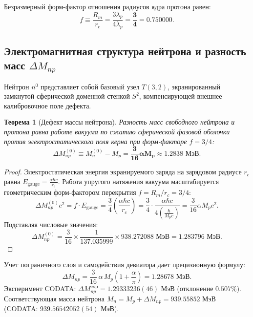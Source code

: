 \documentclass[11pt,a4paper]{article}
\newtheorem{theorem}{Теорема}[section]
\theoremstyle{definition}
\theoremstyle{remark}
\begin{document}
Безразмерный форм-фактор отношения радиусов ядра протона равен:
\begin{equation}
    f \equiv \frac{R_m}{r_c} = \frac{3\lambda_p}{4\lambda_p} = \boldsymbol{\frac{3}{4}} = 0.750000.
    \label{eq:radius_ratio}
\end{equation}

\subsection{Электромагнитная структура нейтрона и разность масс $\Delta M_{np}$}
Нейтрон $n^0$ представляет собой базовый узел $T(3,2)$, экранированный замкнутой сферической доменной стенкой $S^2$, компенсирующей внешнее калибровочное поле дефекта.

\begin{theorem}[Дефект массы нейтрона]
Разность масс свободного нейтрона и протона равна работе вакуума по сжатию сферической фазовой оболочки против электростатического поля керна при форм-факторе $f = 3/4$:
\begin{equation}
    \Delta M_{np}^{(0)} \equiv M_n^{(0)} - M_p = \boldsymbol{\frac{3}{16}\alpha M_p} \approx \mathbf{1.2838\text{ МэВ}}.
    \label{eq:delta_mnp_tree}
\end{equation}
\end{theorem}

\begin{proof}
Электростатическая энергия экранируемого заряда на зарядовом радиусе $r_c$ равна $E_{\mathrm{gauge}} = \frac{\alpha \hbar c}{r_c}$. Работа упругого натяжения вакуума масштабируется геометрическим форм-фактором перекрытия $f = R_m / r_c = 3/4$:
\begin{equation}
    \Delta M_{np}^{(0)} c^2 = f \cdot E_{\mathrm{gauge}} = \frac{3}{4} \left( \frac{\alpha \hbar c}{r_c} \right) = \frac{3}{4} \cdot \frac{\alpha \hbar c}{4 \left( \frac{\hbar}{M_p c} \right)} = \frac{3}{16}\alpha M_p c^2.
\end{equation}
Подставляя числовые значения:
\begin{equation}
    \Delta M_{np}^{(0)} = \frac{3}{16} \times \frac{1}{137.035999} \times 938.272088\text{ МэВ} = 1.283796\text{ МэВ}.
\end{equation}
\end{proof}

Учет пограничного слоя и самодействия девиатора дает прецизионную формулу:
\begin{equation}
    \Delta M_{np} = \frac{3}{16}\,\alpha\,M_p\left(1 + \frac{\alpha}{\pi}\right) = \mathbf{1.28678\text{ МэВ}}.
    \label{eq:delta_mnp_full}
\end{equation}
Эксперимент CODATA: $\Delta M_{np}^{\mathrm{exp}} = 1.29333236(46)$ МэВ (отклонение $0.507\%$). Соответствующая масса нейтрона $M_n = M_p + \Delta M_{np} = 939.55852$ МэВ (CODATA: $939.56542052(54)$ МэВ).
\end{document}
